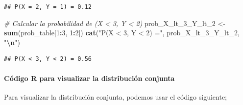 \documentclass[
]{article}
\newenvironment{Shaded}{\begin{snugshade}}{\end{snugshade}}
\newcommand{\CommentTok}[1]{\textcolor[rgb]{0.56,0.35,0.01}{\textit{#1}}}
\newcommand{\DecValTok}[1]{\textcolor[rgb]{0.00,0.00,0.81}{#1}}
\newcommand{\FunctionTok}[1]{\textcolor[rgb]{0.13,0.29,0.53}{\textbf{#1}}}
\newcommand{\NormalTok}[1]{#1}
\newcommand{\OtherTok}[1]{\textcolor[rgb]{0.56,0.35,0.01}{#1}}
\newcommand{\SpecialCharTok}[1]{\textcolor[rgb]{0.81,0.36,0.00}{\textbf{#1}}}
\newcommand{\StringTok}[1]{\textcolor[rgb]{0.31,0.60,0.02}{#1}}
\begin{document}
\begin{verbatim}
## P(X = 2, Y = 1) = 0.12
\end{verbatim}

\begin{Shaded}
\begin{Highlighting}[]
\CommentTok{\# Calcular la probabilidad de (X \textless{} 3, Y \textless{} 2)}
\NormalTok{prob\_X\_lt\_3\_Y\_lt\_2 }\OtherTok{\textless{}{-}} \FunctionTok{sum}\NormalTok{(prob\_table[}\DecValTok{1}\SpecialCharTok{:}\DecValTok{3}\NormalTok{, }\DecValTok{1}\SpecialCharTok{:}\DecValTok{2}\NormalTok{])}
\FunctionTok{cat}\NormalTok{(}\StringTok{"P(X \textless{} 3, Y \textless{} 2) ="}\NormalTok{, prob\_X\_lt\_3\_Y\_lt\_2, }\StringTok{"}\SpecialCharTok{\textbackslash{}n}\StringTok{"}\NormalTok{)}
\end{Highlighting}
\end{Shaded}

\begin{verbatim}
## P(X < 3, Y < 2) = 0.56
\end{verbatim}

\paragraph{Código R para visualizar la distribución conjunta}\label{cuxf3digo-r-para-visualizar-la-distribuciuxf3n-conjunta}

Para visualizar la distribución conjunta, podemos usar el código siguiente;
\end{document}
